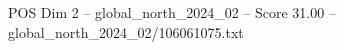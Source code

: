 \begin{textsample}{POS Dim 2 – global\_north\_2024\_02 – Score 31.00 – global\_north\_2024\_02/106061075.txt}
\end{textsample}
